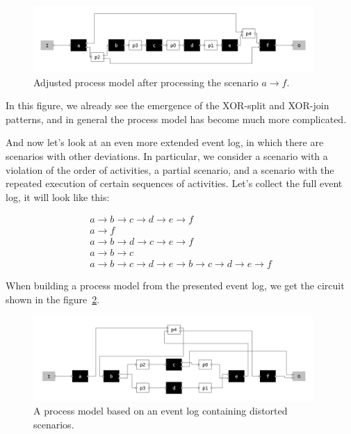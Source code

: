 \documentclass[
11pt,%
tightenlines,%
twoside,%
onecolumn,%
nofloats,%
nobibnotes,%
nofootinbib,%
superscriptaddress,%
noshowpacs,%
centertags]%
{revtex4}
\begin{document}
\begin{figure}[h]
\setcaptionmargin{5mm}
\includegraphics[width=0.95\textwidth]{pics/second1.png}
\caption{Adjusted process model after processing the scenario $a \rightarrow f$.}
\label{fig:second1}
\end{figure}

In this figure, we already see the emergence of the XOR-split and XOR-join patterns, and in general the process model has become much more complicated.

And now let's look at an even more extended event log, in which there are scenarios with other deviations.
In particular, we consider a scenario with a violation of the order of activities, a partial scenario, and a scenario with the repeated execution of certain sequences of activities.
Let's collect the full event log, it will look like this:

\begin{eqnarray*}
a \rightarrow b \rightarrow c \rightarrow d \rightarrow e \rightarrow f \\
a \rightarrow f \\
a \rightarrow b \rightarrow d \rightarrow c \rightarrow e \rightarrow f \\
a \rightarrow b \rightarrow c \\
a \rightarrow b \rightarrow c \rightarrow d \rightarrow e \rightarrow b \rightarrow c \rightarrow d \rightarrow e \rightarrow f
\end{eqnarray*}

When building a process model from the presented event log, we get the circuit shown in the figure~\ref{fig:third1}.

\begin{figure}[h]
\setcaptionmargin{5mm}
\includegraphics[width=0.95\textwidth]{pics/third1.png}
\caption{A process model based on an event log containing distorted scenarios.}
\label{fig:third1}
\end{figure}
\end{document}
